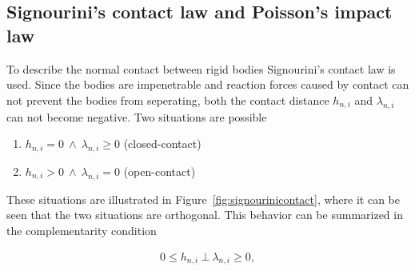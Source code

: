 \documentclass[../DC2017114Bouma.tex]{subfiles}
\begin{document}
\subsection{Signourini's contact law and Poisson's impact law}
To describe the normal contact between rigid bodies Signourini's contact law is used. Since the bodies are impenetrable and reaction forces caused by contact can not prevent the bodies from seperating, both the contact distance $h_{n,i}$ and $\lambda_{n,i}$ can not become negative. Two situations are possible

\begin{enumerate}
\item $h_{n,i}=0\ \wedge\ \lambda_{n,i} \geq 0$ (closed-contact)
\item $h_{n,i}>0\ \wedge\ \lambda_{n,i} = 0$ (open-contact)
\end{enumerate}

These situations are illustrated in Figure~\ref{fig:signourinicontact}, where it can be seen that the two situations are orthogonal. This behavior can be summarized in the complementarity condition

\begin{align}
0\leq h_{n,i}\ \bot\ \lambda_{n,i} \geq 0,\label{eq:signourini}
\end{align}
\end{document}
